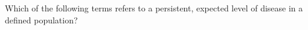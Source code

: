 Which of the following terms refers to a persistent, expected level of disease in a defined population?

